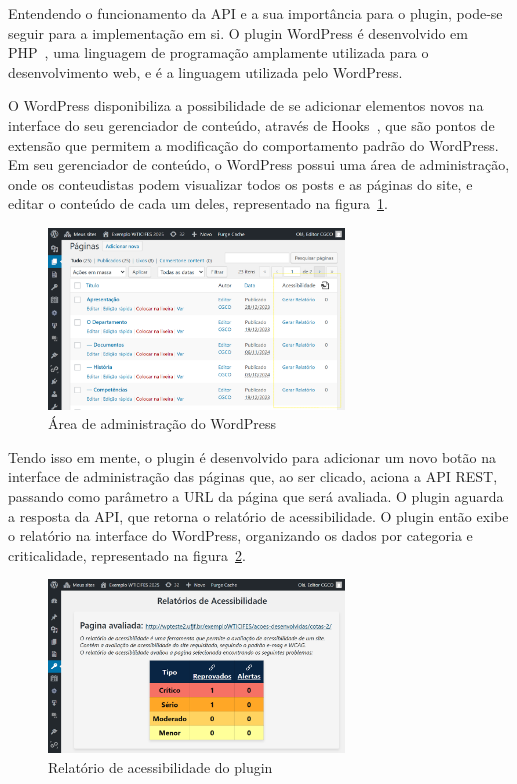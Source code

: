 \documentclass[
	article,			%
	12pt,				%
	oneside,			%
	a4paper,			%
	section=TITLE,		%
	subsection=TITLE,	%
	english,			%
	brazil,				%
	sumario=tradicional
	]{abntex2}
\begin{document}
Entendendo o funcionamento da API e a sua importância para o
plugin, pode-se seguir para a implementação em si. O plugin WordPress
é desenvolvido em PHP~\cite{php}, uma linguagem de programação amplamente utilizada
para o desenvolvimento web, e é a linguagem utilizada pelo WordPress.

O WordPress disponibiliza a possibilidade de se adicionar elementos novos na interface
do seu gerenciador de conteúdo, através de Hooks~\cite{hooks}, que são pontos
de extensão que permitem a modificação do comportamento padrão do WordPress. Em seu
gerenciador de conteúdo, o WordPress possui uma área de administração, onde
os conteudistas podem visualizar todos os posts e as páginas do site, e editar o conteúdo
de cada um deles, representado na figura~\ref{fig:wp-admin}.
\begin{figure}[ht]
    \centering
    \caption{Área de administração do WordPress}
    \label{fig:wp-admin}
    \includegraphics[width=0.7\textwidth]{imagem1.png}
\end{figure}

Tendo isso em mente, o plugin é desenvolvido para adicionar um novo botão na
interface de administração das páginas que, ao ser clicado, aciona a API REST,
passando como parâmetro a URL da página que será avaliada. O plugin aguarda a resposta da API, 
que retorna o relatório de acessibilidade. O plugin
então exibe o relatório na interface do WordPress, organizando os dados
por categoria e criticalidade, representado na figura~\ref{fig:relatorio}.

\begin{figure}[ht]
    \centering
    \caption{Relatório de acessibilidade do plugin}
    \label{fig:relatorio}
\includegraphics[width=0.7\textwidth]{imagem2.png}
\end{figure}
\end{document}
